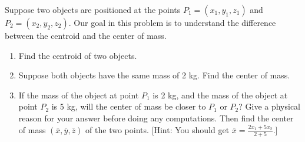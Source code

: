 \begin{problem}\label{center of mass with two points}%
 Suppose two objects are positioned at the points $P_1=(x_1,y_1,z_1)$ and $P_2=(x_2,y_2,z_2)$.
 Our goal in this problem is to understand the difference between the centroid and the center of mass.
\begin{enumerate}
\item Find the centroid of two objects.
 \item Suppose both objects have the same mass of 2 kg.  Find the center of mass.%
 \item If the mass of the object at point $P_1$ is 2 kg, and the mass of the object at point $P_2$ is 5 kg, will the center of mass be closer to $P_1$ or $P_2$? Give a physical reason for your answer before doing any computations.  Then find the center of mass $(\bar x, \bar y, \bar z)$ of the two points. [Hint: You should get $\bar x= \frac{2x_1+5x_2}{2+5}$.] 
\end{enumerate}
\end{problem}


